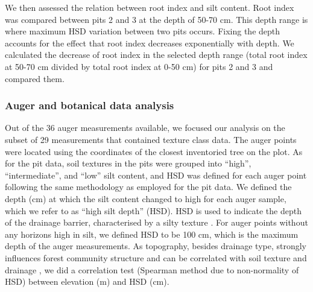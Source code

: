 \documentclass[fleqn,12pt]{latex/stylish_article} %
\begin{document}
We then assessed the relation between root index and silt content. Root index was compared between pits 2 and 3 at the depth of 50-70 cm. This depth range is where maximum HSD variation between two pits occurs. Fixing the depth accounts for the effect that root index decreases exponentially with depth. We calculated the decrease of root index in the selected depth range (total root index at 50-70 cm divided by total root index at 0-50 cm) for pits 2 and 3 and compared them.

\hypertarget{auger-and-botanical-data-analysis}{%
\subsubsection{Auger and botanical data analysis}\label{auger-and-botanical-data-analysis}}

Out of the 36 auger measurements available, we focused our analysis on the subset of 29 measurements that contained texture class data. The auger points were located using the coordinates of the closest inventoried tree on the plot. As for the pit data, soil textures in the pits were grouped into \enquote{high}, \enquote{intermediate}, and \enquote{low} silt content, and HSD was defined for each auger point following the same methodology as employed for the pit data. We defined the depth (cm) at which the silt content changed to high for each auger sample, which we refer to as \enquote{high silt depth} (HSD). HSD is used to indicate the depth of the drainage barrier, characterised by a silty texture \citep{ferryGeneseFonctionnementHydrique2003, humbelCaracterisationParMesures1978}. For auger points without any horizons high in silt, we defined HSD to be 100 cm, which is the maximum depth of the auger measurements. As topography, besides drainage type, strongly influences forest community structure \citep{baldeckSoilResourcesTopography2013, ferryHigherTreefallRates2010} and can be correlated with soil texture and drainage \citep{epronSpatialVariationSoil2006}, we did a correlation test (Spearman method due to non-normality of HSD) between elevation (m) and HSD (cm).
\end{document}
